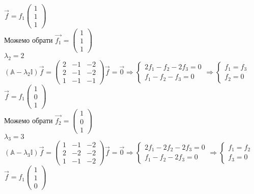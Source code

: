 \documentclass[a4paper, 14pt]{extarticle}
\def\bigline{\vspace{5mm}\\}
\begin{document}
$\vec{f} = f_1 \begin{pmatrix}
1 \\ 1 \\ 1
\end{pmatrix}$\\
Можемо обрати $\vec{f_1} = \begin{pmatrix}
1 \\ 1 \\ 1
\end{pmatrix}$
\bigline
$\lambda_2 = 2$\\
$(\mathbb{A} - \lambda_2 \mathbb{I})\vec{f} =\begin{pmatrix}
2 & -1 & -2 \\
2 & -1 & -2 \\
1 & -1 & -1
\end{pmatrix} \vec{f} = \vec{0} \Rightarrow \begin{cases} 2f_1 - f_2 - 2f_3 = 0 \\ f_1 - f_2 - f_3 = 0 \end{cases} \Rightarrow \begin{cases} f_1 = f_3 \\ f_2 = 0 \end{cases}$\\
$\vec{f} = f_1 \begin{pmatrix}
1 \\ 0 \\ 1
\end{pmatrix}$\\
Можемо обрати $\vec{f_2} = \begin{pmatrix}
1 \\ 0 \\ 1
\end{pmatrix}$
\bigline
$\lambda_3 = 3$\\
$(\mathbb{A} - \lambda_3 \mathbb{I})\vec{f} =\begin{pmatrix}
1 & -1 & -2 \\
2 & -2 & -2 \\
1 & -1 & -2
\end{pmatrix} \vec{f} = \vec{0} \Rightarrow \begin{cases} 2f_1 - 2f_2 - 2f_3 = 0 \\ f_1 - f_2 - 2f_3 = 0 \end{cases} \Rightarrow \begin{cases} f_1 = f_2 \\ f_3 = 0 \end{cases}$\\
$\vec{f} = f_1 \begin{pmatrix}
1 \\ 1 \\ 0
\end{pmatrix}$\\
\end{document}
